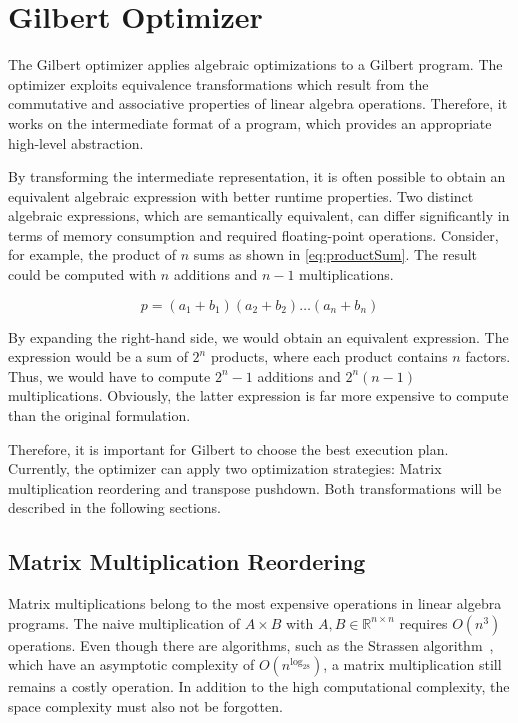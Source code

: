 \chapter{Gilbert Optimizer}
\label{cha:optimizer}


The Gilbert optimizer applies algebraic optimizations to a Gilbert program.
The optimizer exploits equivalence transformations which result from the commutative and associative properties of linear algebra operations.
Therefore, it works on the intermediate format of a program, which provides an appropriate high-level abstraction.

By transforming the intermediate representation, it is often possible to obtain an equivalent algebraic expression with better runtime properties.
Two distinct algebraic expressions, which are semantically equivalent, can differ significantly in terms of memory consumption and required floating-point operations.
Consider, for example, the product of $n$ sums as shown in \cref{eq:productSum}.
The result could be computed with $n$ additions and $n-1$ multiplications.

\begin{equation}
	p = (a_1 + b_1)(a_2 + b_2)\ldots(a_n + b_n) \label{eq:productSum}
\end{equation}

By expanding the right-hand side, we would obtain an equivalent expression.
The expression would be a sum of $2^n$ products, where each product contains $n$ factors.
Thus, we would have to compute $2^n-1$ additions and $2^n(n-1)$ multiplications.
Obviously, the latter expression is far more expensive to compute than the original formulation.

Therefore, it is important for Gilbert to choose the best execution plan.
Currently, the optimizer can apply two optimization strategies: Matrix multiplication reordering and transpose pushdown.
Both transformations will be described in the following sections.

\section{Matrix Multiplication Reordering}

Matrix multiplications belong to the most expensive operations in linear algebra programs.
The naive multiplication of $A\times B$ with $A,B \in \mathbb{R}^{n \times n}$ requires $O(n^3)$ operations.
Even though there are algorithms, such as the Strassen algorithm~\cite{strassen:nm1969a}, which have an asymptotic complexity of $O(n^{\log_28})$, a matrix multiplication still remains a costly operation.
In addition to the high computational complexity, the space complexity must also not be forgotten.

